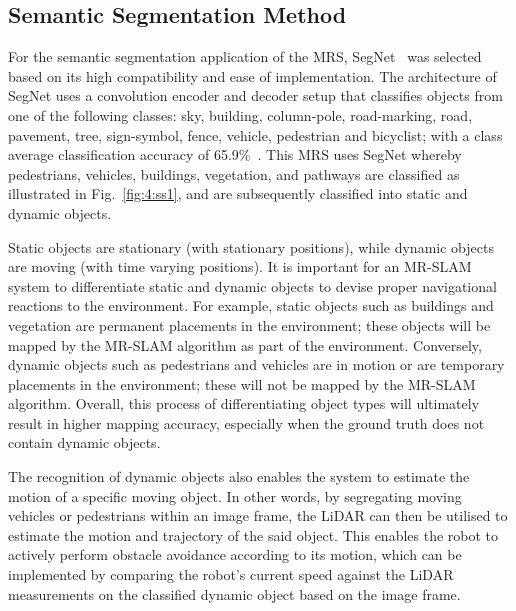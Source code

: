 \subsection{Semantic Segmentation Method}
For the semantic segmentation application of the MRS, SegNet~\cite{badrinarayanan_segnet:_2017} was selected based on its high compatibility and ease of implementation. The architecture of SegNet uses a convolution encoder and decoder setup that classifies objects from one of the following classes: sky, building, column-pole, road-marking, road, pavement, tree, sign-symbol, fence, vehicle, pedestrian and bicyclist; with a class average classification accuracy of 65.9\%~\cite{badrinarayanan_segnet:_2017}. This MRS uses SegNet whereby pedestrians, vehicles, buildings, vegetation, and pathways are classified as illustrated in Fig.~\ref{fig:4:ss1}, and are subsequently classified into static and dynamic objects.

Static objects are stationary (with stationary positions), while dynamic objects are moving (with time varying positions). It is important for an MR-SLAM system to differentiate static and dynamic objects to devise proper navigational reactions to the environment. For example, static objects such as buildings and vegetation are permanent placements in the environment; these objects will be mapped by the MR-SLAM algorithm as part of the environment. Conversely, dynamic objects such as pedestrians and vehicles are in motion or are temporary placements in the environment; these will not be mapped by the MR-SLAM algorithm. Overall, this process of differentiating object types will ultimately result in higher mapping accuracy, especially when the ground truth does not contain dynamic objects.

The recognition of dynamic objects also enables the system to estimate the motion of a specific moving object. In other words, by segregating moving vehicles or pedestrians within an image frame, the LiDAR can then be utilised to estimate the motion and trajectory of the said object. This enables the robot to actively perform obstacle avoidance according to its motion, which can be implemented by comparing the robot’s current speed against the LiDAR measurements on the classified dynamic object based on the image frame.

